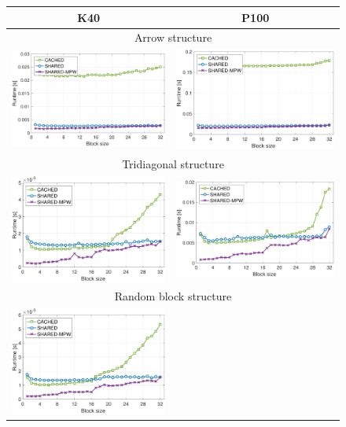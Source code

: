 \begin{figure}[p]
\begin{center}
{\scriptsize
\begin{tabular}{cc}
K40 & P100\\
\hline
\multicolumn{2}{c}{Arrow structure}\\
\includegraphics[width=.46\columnwidth]{plots/ARR_bjp_setup_bs_d_K40.pdf}
&
\includegraphics[width=.46\columnwidth]{plots/ARR_bjp_setup_bs_d_P100.pdf}\\
\hline
\multicolumn{2}{c}{Tridiagonal structure}\\
\includegraphics[width=.46\columnwidth]{plots/TDG_bjp_setup_bs_d_K40.pdf}
&
\includegraphics[width=.46\columnwidth]{plots/TDG_bjp_setup_bs_d_P100.pdf}\\
\hline
\multicolumn{2}{c}{Random block structure}\\
\includegraphics[width=.46\columnwidth]{plots/RND_bjp_setup_bs_d_K40.pdf}

\end{tabular}}
\end{center}
\end{figure}

